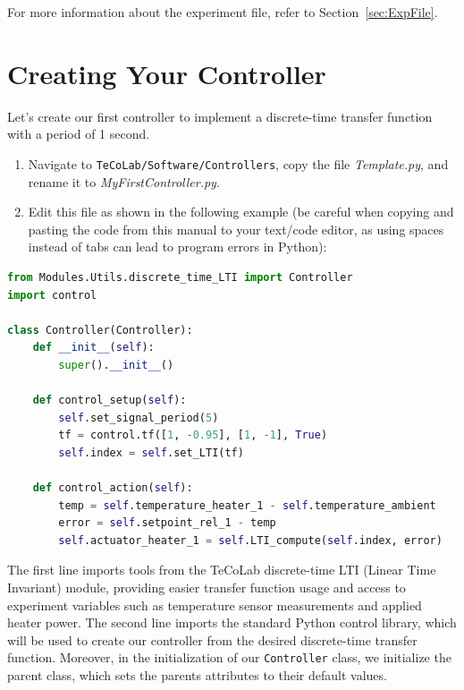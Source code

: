 \documentclass[12pt]{report}
\begin{document}
For more information about the experiment file, refer to Section~\ref{sec:ExpFile}.


\section{Creating Your Controller}

Let's create our first controller to implement a discrete-time transfer function with a period of 1 second.

\begin{enumerate}
    \item Navigate to \texttt{TeCoLab/Software/Controllers}, copy the file \emph{Template.py}, and rename it to \emph{MyFirstController.py}.
    \item Edit this file as shown in the following example (be careful when copying and pasting the code from this manual to your text/code editor, as using spaces instead of tabs can lead to program errors in Python):
\end{enumerate}

\begin{lstlisting}[language = Python, tabsize = 2]
from Modules.Utils.discrete_time_LTI import Controller
import control

class Controller(Controller):
	def __init__(self):
		super().__init__()

	def control_setup(self):
		self.set_signal_period(5)
		tf = control.tf([1, -0.95], [1, -1], True)
		self.index = self.set_LTI(tf)

	def control_action(self):
		temp = self.temperature_heater_1 - self.temperature_ambient
		error = self.setpoint_rel_1 - temp
		self.actuator_heater_1 = self.LTI_compute(self.index, error)
\end{lstlisting}

The first line imports tools from the TeCoLab discrete-time LTI (Linear Time Invariant) module, providing easier transfer function usage and access to experiment variables such as temperature sensor measurements and applied heater power. The second line imports the standard Python control library, which will be used to create our controller from the desired discrete-time transfer function. Moreover, in the initialization of our \texttt{Controller} class, we initialize the parent class, which sets the parents attributes to their default values.
\end{document}
